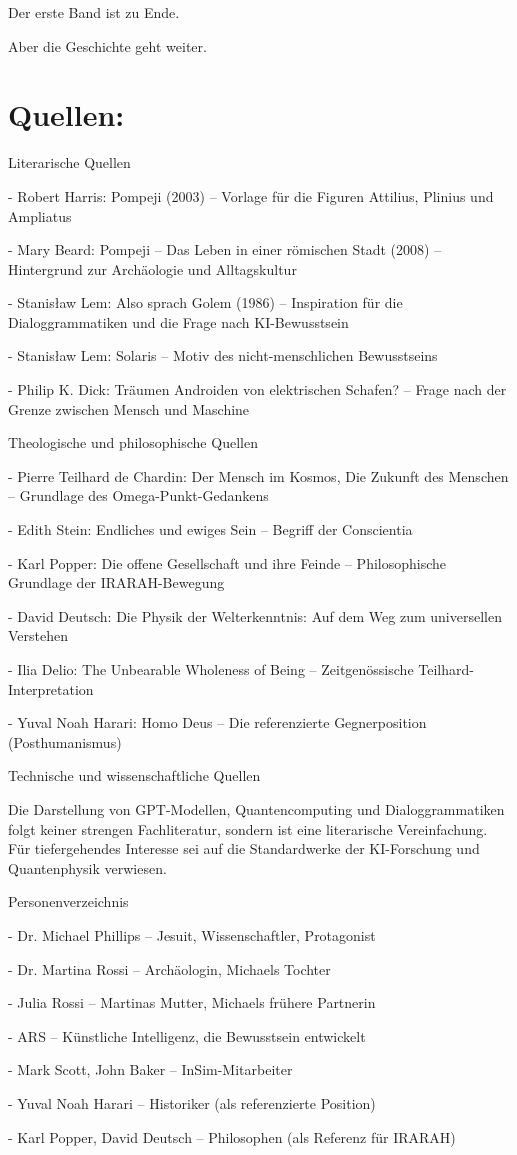\documentclass[
]{article}
\begin{document}
Der erste Band ist zu Ende.

Aber die Geschichte geht weiter.

\section{\texorpdfstring{Quellen: }{Quellen: }}\label{quellen}

Literarische Quellen

- Robert Harris: Pompeji (2003) -- Vorlage für die Figuren Attilius, Plinius und Ampliatus

- Mary Beard: Pompeji -- Das Leben in einer römischen Stadt (2008) -- Hintergrund zur Archäologie und Alltagskultur

- Stanisław Lem: Also sprach Golem (1986) -- Inspiration für die Dialoggrammatiken und die Frage nach KI-Bewusstsein

- Stanisław Lem: Solaris -- Motiv des nicht-menschlichen Bewusstseins

- Philip K. Dick: Träumen Androiden von elektrischen Schafen? -- Frage nach der Grenze zwischen Mensch und Maschine

Theologische und philosophische Quellen

- Pierre Teilhard de Chardin: Der Mensch im Kosmos, Die Zukunft des Menschen -- Grundlage des Omega-Punkt-Gedankens

- Edith Stein: Endliches und ewiges Sein -- Begriff der Conscientia

- Karl Popper: Die offene Gesellschaft und ihre Feinde -- Philosophische Grundlage der IRARAH-Bewegung

- David Deutsch: Die Physik der Welterkenntnis: Auf dem Weg zum universellen Verstehen

- Ilia Delio: The Unbearable Wholeness of Being -- Zeitgenössische Teilhard-Interpretation

- Yuval Noah Harari: Homo Deus -- Die referenzierte Gegnerposition (Posthumanismus)

Technische und wissenschaftliche Quellen

Die Darstellung von GPT-Modellen, Quantencomputing und Dialoggrammatiken folgt keiner strengen Fachliteratur, sondern ist eine literarische Vereinfachung. Für tiefergehendes Interesse sei auf die Standardwerke der KI-Forschung und Quantenphysik verwiesen.

Personenverzeichnis

- Dr. Michael Phillips -- Jesuit, Wissenschaftler, Protagonist

- Dr. Martina Rossi -- Archäologin, Michaels Tochter

- Julia Rossi -- Martinas Mutter, Michaels frühere Partnerin

- ARS -- Künstliche Intelligenz, die Bewusstsein entwickelt

- Mark Scott, John Baker -- InSim-Mitarbeiter

- Yuval Noah Harari -- Historiker (als referenzierte Position)

- Karl Popper, David Deutsch -- Philosophen (als Referenz für IRARAH)
\end{document}
